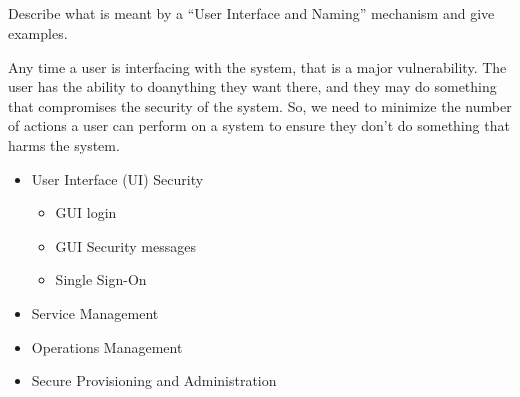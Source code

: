 \begin{questions}
\begin{parts}
  \part{} Describe what is meant by a ``User Interface and Naming'' mechanism and give examples.
    \begin{solution}
      Any time a user is interfacing with the system, that is a major vulnerability.
      The user has the ability to doanything they want there, and they may do something that compromises the security of the system.
      So, we need to minimize the number of actions a user can perform on a system to ensure they don't do something that harms the system.
      \begin{itemize}[noitemsep]
      \item User Interface (UI) Security
        \begin{itemize}[noitemsep]
        \item GUI login
        \item GUI Security messages
        \item Single Sign-On
        \end{itemize}
      \item Service Management
      \item Operations Management
      \item Secure Provisioning and Administration
      \end{itemize}
    \end{solution}


\end{parts}
\end{questions}
